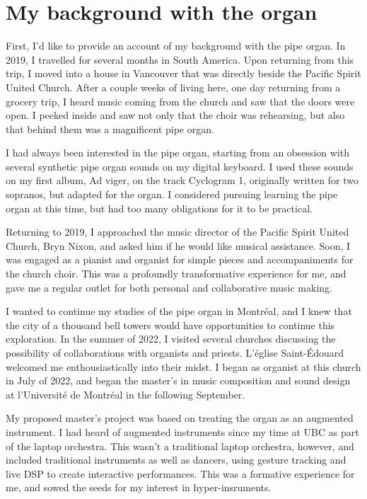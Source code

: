 \documentclass[12pt,twoside,maitrise]{dms_ks}
\theoremstyle{definition}
\begin{document}
{\section{My background with the organ}

First, I’d like to provide an account of my background with the pipe organ.
In 2019, I travelled for several months in South America.
Upon returning from this trip, I moved into a house in Vancouver that was directly beside the Pacific Spirit United Church.
After a couple weeks of living here, one day returning from a grocery trip, I heard music coming from the church and saw that the doors were open.
I peeked inside and saw not only that the choir was rehearsing, but also that behind them was a magnificent pipe organ.

I had always been interested in the pipe organ, starting from an obsession with several synthetic pipe organ sounds on my digital keyboard.
I used these sounds on my first album, Ad viger, on the track Cyclogram 1, originally written for two sopranos, but adapted for the organ.
I considered pursuing learning the pipe organ at this time, but had too many obligations for it to be practical.

Returning to 2019, I approached the music director of the Pacific Spirit United Church, Bryn Nixon, and asked him if he would like musical assistance.
Soon, I was engaged as a pianist and organist for simple pieces and accompaniments for the church choir.
This was a profoundly transformative experience for me, and gave me a regular outlet for both personal and collaborative music making.

I wanted to continue my studies of the pipe organ in Montréal, and I knew that the city of a thousand bell towers would have opportunities to continue this exploration.
In the summer of 2022, I visited several churches discussing the possibility of collaborations with organists and priests. L’église Saint-Édouard welcomed me enthousiastically into their midst.
I began as organist at this church in July of 2022, and began the master’s in music composition and sound design at l’Université de Montréal in the following September.

My proposed master’s project was based on treating the organ as an augmented instrument.
I had heard of augmented instruments since my time at UBC as part of the laptop orchestra.
This wasn’t a traditional laptop orchestra, however, and included traditional instruments as well as dancers, using gesture tracking and live DSP to create interactive performances.
This was a formative experience for me, and sowed the seeds for my interest in hyper-insruments.

}
\end{document}
